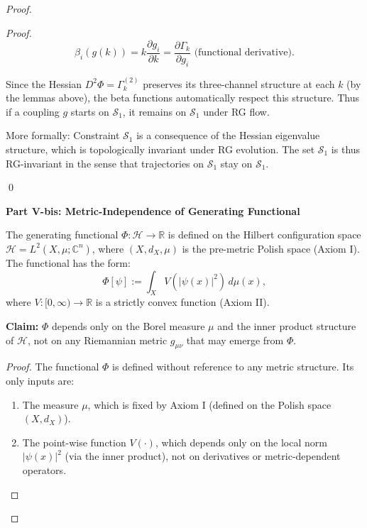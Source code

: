 \begin{proof}
\begin{lemma}
\begin{proof}
\begin{equation}
\beta_i(g(k)) = k \frac{\partial g_i}{\partial k} = \frac{\partial \Gamma_k}{\partial g_i} \text{ (functional derivative)}.
\end{equation}

Since the Hessian $D^2\Phi = \Gamma_k^{(2)}$ preserves its three-channel structure at each $k$ (by the lemmas above), the beta functions automatically respect this structure. Thus if a coupling $g$ starts on $\mathcal{S}_1$, it remains on $\mathcal{S}_1$ under RG flow.

More formally: Constraint $\mathcal{S}_1$ is a consequence of the Hessian eigenvalue structure, which is topologically invariant under RG evolution. The set $\mathcal{S}_1$ is thus RG-invariant in the sense that trajectories on $\mathcal{S}_1$ stay on $\mathcal{S}_1$.

\qed

\end{proof}

\end{lemma}

\noindent\textbf{Part V-bis: Metric-Independence of Generating Functional}

\begin{lemma}
\label{lem:divergenceMetricIndependence}

The generating functional $\Phi: \mathcal{H} \to \mathbb{R}$ is defined on the Hilbert configuration space $\mathcal{H} = L^2(X, \mu; \mathbb{C}^n)$, where $(X, d_X, \mu)$ is the pre-metric Polish space (Axiom I). The functional has the form:
\begin{equation}
\Phi[\psi] := \int_X V(|\psi(x)|^2) \, d\mu(x),
\end{equation}
where $V: [0, \infty) \to \mathbb{R}$ is a strictly convex function (Axiom II).

\noindent\textbf{Claim:} $\Phi$ depends only on the Borel measure $\mu$ and the inner product structure of $\mathcal{H}$, not on any Riemannian metric $g_{\mu\nu}$ that may emerge from $\Phi$.

\begin{proof}

The functional $\Phi$ is defined without reference to any metric structure. Its only inputs are:
\begin{enumerate}
\item The measure $\mu$, which is fixed by Axiom I (defined on the Polish space $(X, d_X)$).
\item The point-wise function $V(\cdot)$, which depends only on the local norm $|\psi(x)|^2$ (via the inner product), not on derivatives or metric-dependent operators.
\end{enumerate}


\end{proof}
\end{lemma}
\end{proof}
